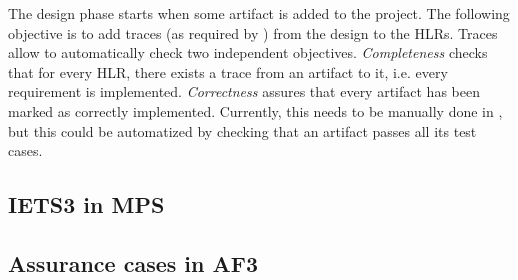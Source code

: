 The design phase starts when some artifact is added to the project.
The following objective is to add traces (as required by \doone) from the design to the HLRs.
Traces allow to automatically check two independent objectives.
\emph{Completeness} checks that for every HLR, there exists a trace from an artifact to it, i.e. every requirement is implemented.
\emph{Correctness} assures that every artifact has been marked as correctly implemented.
Currently, this needs to be manually done in \afthree, but this could be automatized by checking that an artifact passes all its test cases.

\subsection{IETS3 in MPS}

\subsection{Assurance cases in AF3}
